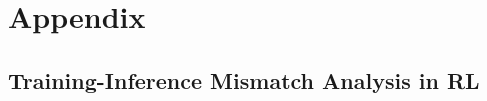 \clearpage
\section{Appendix}
\subsection{Training-Inference Mismatch Analysis in RL}
\label{rl_appendix}




